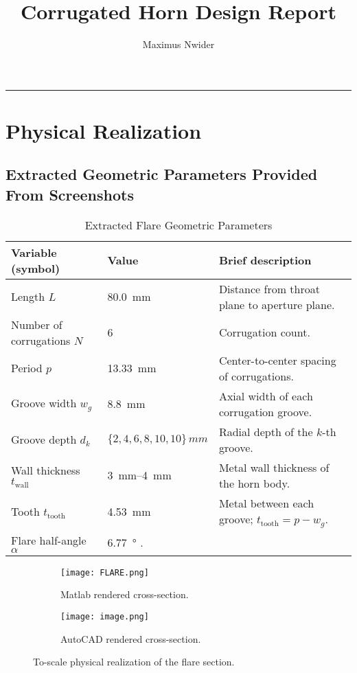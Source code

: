 \documentclass[11pt]{article}
\title{\textbf{Corrugated Horn Design Report}}
\author{Maximus Nwider}
\date{}
\begin{document}
\maketitle

\tableofcontents
\hrule\vspace{0.8em}



\section{Physical Realization}
\subsection{Extracted Geometric Parameters Provided From Screenshots}
\begin{table}[H]
  \centering
  \caption{Extracted Flare Geometric Parameters}
  \label{tab:geom}
  \begin{tabularx}{\linewidth}{@{}l l X@{}}
    \toprule
    \textbf{Variable (symbol)} & \textbf{Value} & \textbf{Brief description} \\
    \midrule
    Length $L$ & \SI{80.0}{\milli\meter} & Distance from throat plane to aperture plane. \\
    Number of corrugations $N$ & 6 & Corrugation count. \\
    Period $p$ & \SI{13.33}{\milli\meter} & Center-to-center spacing of corrugations. \\
    Groove width $w_g$ & \SI{8.8}{\milli\meter} & Axial width of each corrugation groove. \\
    Groove depth $d_k$ & $\{2,4,6,8,10,10\}\,\si{mm}$ & Radial depth of the $k$-th groove. \\
    Wall thickness $t_{\text{wall}}$ & \SIrange{3}{4}{\milli\meter} & Metal wall thickness of the horn body. \\
    Tooth $t_{\text{tooth}}$ & \SI{4.53}{\milli\meter} & Metal between each groove; $t_{\text{tooth}}=p-w_g$. \\
    Flare half-angle $\alpha$ & \SI{6.77}{\degree} . \\
    \bottomrule
  \end{tabularx}
\end{table}
\begin{figure}[H]
  \centering
  \begin{subfigure}[b]{0.4\textwidth}
    \centering
    \texttt{[image: FLARE.png]}
    \caption{Matlab rendered cross-section.}
    \label{fig:matlab_xsec}
  \end{subfigure}
  \begin{subfigure}[b]{0.4\textwidth}
    \centering
    \texttt{[image: image.png]}
    \caption{AutoCAD rendered cross-section.}
    \label{fig:acad_xsec}
  \end{subfigure}
  \caption{To-scale physical realization of the flare section.}
\end{figure}
\end{document}
